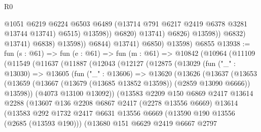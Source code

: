 \begin{lexlean}{R0}
\begin{coremodule}
                                      @1051
                                      @6219
                                      @6224
                                      @6503
                                      @6489
                                      (@13714 @791 @6217 @2419 @6378 @3281 @13744 @13741)
                                      @6515)
                                    @13598))
                                @6820)
                              @13741)
                            @6826)
                          @13598))
                      @6832)
                    @13741)
                  @6838)
                @13598))
            @6844)
          @13741)
        @6850)
      @13598)
    @6855
@13938 := fun (s : @61) =>
  fun (e : @61) =>
  fun (m : @61) =>
  @10842
    (@10964
      (@11109
        (@11549
          (@11637
            (@11887
              (@12043
                (@12127
                  (@12875
                    (@13029
                      (fun ("_" : @13030) =>
                      @13605
                        (fun ("_" : @13606) =>
                        @13620
                          (@13626
                            (@13637
                              (@13653
                                (@13659
                                  (@13667 (@13679 (@13685 @13852 @13598)) (@2859 @13090 @6666))
                                  @13598))
                              (@4073 @13100 @13092))
                            (@13583
                              @2209
                              @150
                              @6869
                              @2417
                              @13614
                              @2288
                              (@13607
                                @136
                                @2208
                                @6867
                                @2417
                                (@2278 @13556 @6669)
                                @13614
                                (@13583
                                  @292
                                  @1732
                                  @2417
                                  @6631
                                  @13556
                                  @6669
                                  (@13590 @190 @13556 (@2685 (@13593 @190)))
                                  (@13680
                                    @151
                                    @6629
                                    @2419
                                    @6667
                                    @2797

\end{coremodule}
\end{lexlean}
